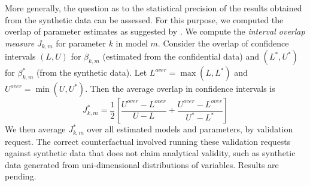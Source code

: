 \documentclass{article}
\begin{document}
More generally, the question as to the statistical precision of the results obtained from the synthetic data can be assessed. For this purpose, we computed the overlap of parameter estimates  as suggested by \cite{tas2006}. We compute the \emph{interval overlap measure} $J_{k,m}$ for parameter $k$ in model $m$. Consider the overlap of confidence intervals $(L,U)$ for $\beta_{k,m}$ (estimated from the confidential data) and $(L^{*},U^{*})$ for $\beta_{k,m}^*$ (from the synthetic data). Let $L^{over} = \max (L,L^{*} )$ and $U^{over} = \min (U,U^{*})$. Then the average overlap in confidence intervals is
$$
J_{k,m}^{*} = \frac{1}{2} \left [ \frac{U^{over} - L^{over}}{U-L} + \frac{U^{over} - L^{over}}{U^*-L ^*}        \right ]
$$
We then average $J_{k,m}^{*}$ over all estimated models and parameters, by validation request. The correct counterfactual involved running these validation requests against synthetic data that does not claim analytical validity, such as synthetic data generated from uni-dimensional distributions of variables. Results are pending.

%
%

%
%

\printbibliography
\end{document}
